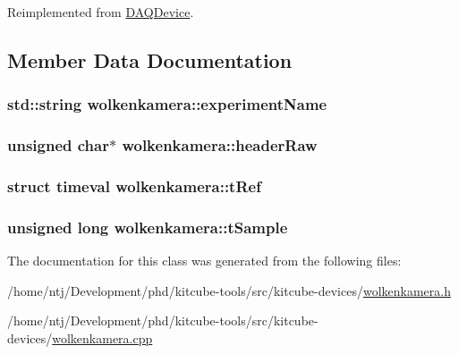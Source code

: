 Reimplemented from \hyperlink{classDAQDevice_aad39c13f039abd6e6a9b0aa21a7c8a4d}{D\-A\-Q\-Device}.



\subsection{Member Data Documentation}
\hypertarget{classwolkenkamera_aa91268dbd611187b783c89ef62dbcfd5}{
\subsubsection[{experiment\-Name}]{\setlength{\rightskip}{0pt plus 5cm}std\-::string wolkenkamera\-::experiment\-Name\hspace{0.3cm}{\ttfamily [private]}}}\label{classwolkenkamera_aa91268dbd611187b783c89ef62dbcfd5}
\hypertarget{classwolkenkamera_a30e481479bddffe39a354b51ef4c7b67}{
\subsubsection[{header\-Raw}]{\setlength{\rightskip}{0pt plus 5cm}unsigned char$\ast$ wolkenkamera\-::header\-Raw\hspace{0.3cm}{\ttfamily [private]}}}\label{classwolkenkamera_a30e481479bddffe39a354b51ef4c7b67}
\hypertarget{classwolkenkamera_afff90fa33b0ee850413fee6e2aa4563f}{
\subsubsection[{t\-Ref}]{\setlength{\rightskip}{0pt plus 5cm}struct timeval wolkenkamera\-::t\-Ref\hspace{0.3cm}{\ttfamily [private]}}}\label{classwolkenkamera_afff90fa33b0ee850413fee6e2aa4563f}
\hypertarget{classwolkenkamera_a5f45de1bc4646afdc2fd112a724e48bd}{
\subsubsection[{t\-Sample}]{\setlength{\rightskip}{0pt plus 5cm}unsigned long wolkenkamera\-::t\-Sample\hspace{0.3cm}{\ttfamily [private]}}}\label{classwolkenkamera_a5f45de1bc4646afdc2fd112a724e48bd}


The documentation for this class was generated from the following files\-:\begin{DoxyCompactItemize}
\item 
/home/ntj/\-Development/phd/kitcube-\/tools/src/kitcube-\/devices/\hyperlink{wolkenkamera_8h}{wolkenkamera.\-h}\item 
/home/ntj/\-Development/phd/kitcube-\/tools/src/kitcube-\/devices/\hyperlink{wolkenkamera_8cpp}{wolkenkamera.\-cpp}\end{DoxyCompactItemize}
